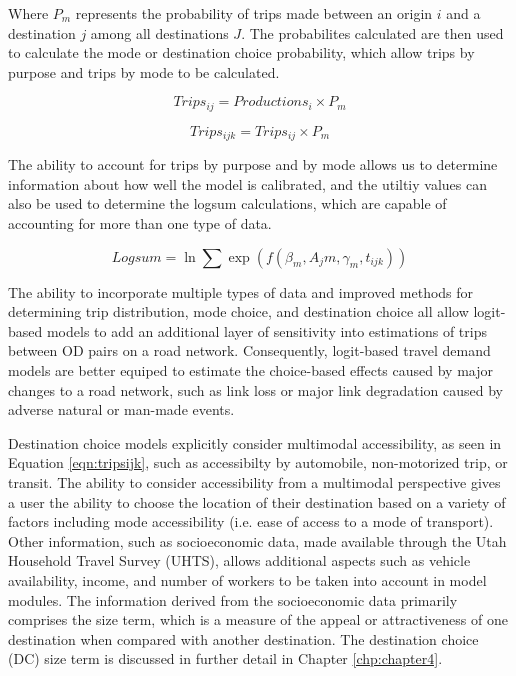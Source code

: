 \noindent Where $P_{m}$ represents the probability of trips made between an
origin $i$ and a destination $j$ among all destinations $J$. The probabilites
calculated are then used to calculate the mode or destination choice probability,
which allow trips by purpose and trips by mode to be calculated.

\begin{equation}
  Trips_{ij} = Productions_{i} \times {P}_{m}
\end{equation}

\begin{equation}
  Trips_{ijk} = Trips_{ij} \times {P}_{m}
  \label{eqn:tripsijk}
\end{equation}

\noindent The ability to account for trips by purpose and by mode allows us to
determine information about how well the model is calibrated, and the utiltiy
values can also be used to determine the logsum calculations, which are capable
of accounting for more than one type of data.

\begin{equation}
 Logsum = \ln\sum\exp(f(\beta_m, A_jm, \gamma_m, t_{ijk}))
  \label{eqn:logsum}
\end{equation}

\noindent The ability to incorporate multiple types of data and improved methods for determining trip distribution, mode choice, and destination choice all allow logit-based models to add an additional layer of sensitivity into estimations of trips between OD pairs on a road network. Consequently, logit-based travel demand models are better equiped to estimate the choice-based effects caused by major changes to a road network, such as link loss or major link degradation caused by adverse natural or man-made events.

Destination choice models explicitly consider multimodal accessibility, as seen
in Equation \ref{eqn:tripsijk}, such as accessibilty by automobile,
non-motorized trip, or transit. The ability to consider accessibility from a
multimodal perspective gives a user the ability to choose the location of
their destination based on a variety of factors including mode accessibility
(i.e. ease of access to a mode of transport). Other information, such as
socioeconomic data, made available through the Utah Household Travel Survey
(UHTS), allows additional aspects such as vehicle availability, income, and
number of workers to be taken into account in model modules. The information
derived from the socioeconomic data primarily comprises the size term, which
is a measure of the appeal or attractiveness of one destination when compared with
another destination. The destination choice (DC) size term is discussed in further detail in
Chapter \ref{chp:chapter4}.

